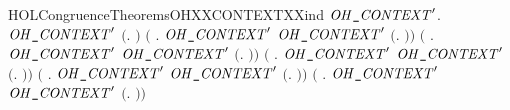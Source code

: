 \begin{SaveVerbatim}{HOLCongruenceTheoremsOHXXCONTEXTXXind}
\HOLTokenTurnstile{} \HOLSymConst{\HOLTokenForall{}}\ensuremath{\HOLBoundVar{OH\HOLTokenUnderscore{}CONTEXT}\sp{\prime}}.
       \ensuremath{\HOLBoundVar{OH\HOLTokenUnderscore{}CONTEXT}\sp{\prime}} \ensuremath{(}\HOLTokenLambda{}. \ensuremath{)} \HOLSymConst{\HOLTokenConj{}}
       \ensuremath{(}\HOLSymConst{\HOLTokenForall{}} . \ensuremath{\HOLBoundVar{OH\HOLTokenUnderscore{}CONTEXT}\sp{\prime}}  \HOLSymConst{\HOLTokenImp{}} \ensuremath{\HOLBoundVar{OH\HOLTokenUnderscore{}CONTEXT}\sp{\prime}} \ensuremath{(}\HOLTokenLambda{}. \HOLSymConst{\ensuremath{\ldotp}} \ensuremath{)}\ensuremath{)} \HOLSymConst{\HOLTokenConj{}}
       \ensuremath{(}\HOLSymConst{\HOLTokenForall{}} . \ensuremath{\HOLBoundVar{OH\HOLTokenUnderscore{}CONTEXT}\sp{\prime}}  \HOLSymConst{\HOLTokenImp{}} \ensuremath{\HOLBoundVar{OH\HOLTokenUnderscore{}CONTEXT}\sp{\prime}} \ensuremath{(}\HOLTokenLambda{}.   \HOLSymConst{\ensuremath{+}} \ensuremath{)}\ensuremath{)} \HOLSymConst{\HOLTokenConj{}}
       \ensuremath{(}\HOLSymConst{\HOLTokenForall{}} . \ensuremath{\HOLBoundVar{OH\HOLTokenUnderscore{}CONTEXT}\sp{\prime}}  \HOLSymConst{\HOLTokenImp{}} \ensuremath{\HOLBoundVar{OH\HOLTokenUnderscore{}CONTEXT}\sp{\prime}} \ensuremath{(}\HOLTokenLambda{}.  \HOLSymConst{\ensuremath{+}}  \ensuremath{)}\ensuremath{)} \HOLSymConst{\HOLTokenConj{}}
       \ensuremath{(}\HOLSymConst{\HOLTokenForall{}} . \ensuremath{\HOLBoundVar{OH\HOLTokenUnderscore{}CONTEXT}\sp{\prime}}  \HOLSymConst{\HOLTokenImp{}} \ensuremath{\HOLBoundVar{OH\HOLTokenUnderscore{}CONTEXT}\sp{\prime}} \ensuremath{(}\HOLTokenLambda{}.   \HOLSymConst{\ensuremath{\mid}} \ensuremath{)}\ensuremath{)} \HOLSymConst{\HOLTokenConj{}}
       \ensuremath{(}\HOLSymConst{\HOLTokenForall{}} . \ensuremath{\HOLBoundVar{OH\HOLTokenUnderscore{}CONTEXT}\sp{\prime}}  \HOLSymConst{\HOLTokenImp{}} \ensuremath{\HOLBoundVar{OH\HOLTokenUnderscore{}CONTEXT}\sp{\prime}} \ensuremath{(}\HOLTokenLambda{}.  \HOLSymConst{\ensuremath{\mid}}  \ensuremath{)}\ensuremath{)} \HOLSymConst{\HOLTokenConj{}}

\end{SaveVerbatim}
